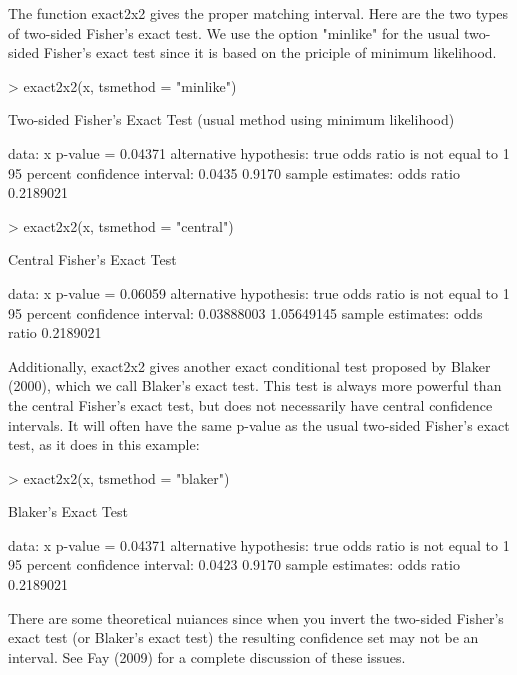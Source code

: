 \documentclass[12pt]{article}
\begin{document}
The function exact2x2 gives the proper matching interval. Here are the two types of two-sided Fisher's exact test. We use the option 
"minlike" for the usual two-sided Fisher's exact test since it is based on the priciple of minimum likelihood.   
\begin{Schunk}
\begin{Sinput}
> exact2x2(x, tsmethod = "minlike")
\end{Sinput}
\begin{Soutput}
	Two-sided Fisher's Exact Test (usual method using minimum likelihood)

data:  x 
p-value = 0.04371
alternative hypothesis: true odds ratio is not equal to 1 
95 percent confidence interval:
 0.0435 0.9170 
sample estimates:
odds ratio 
 0.2189021 
\end{Soutput}
\begin{Sinput}
> exact2x2(x, tsmethod = "central")
\end{Sinput}
\begin{Soutput}
	Central Fisher's Exact Test

data:  x 
p-value = 0.06059
alternative hypothesis: true odds ratio is not equal to 1 
95 percent confidence interval:
 0.03888003 1.05649145 
sample estimates:
odds ratio 
 0.2189021 
\end{Soutput}
\end{Schunk}

Additionally, exact2x2 gives another exact conditional test proposed by Blaker (2000), which we call Blaker's exact test. This test is always more powerful than 
the central Fisher's exact test, but does not necessarily have central confidence intervals. It will often have the same p-value as the usual two-sided 
Fisher's exact test, as it does in this example:
\begin{Schunk}
\begin{Sinput}
> exact2x2(x, tsmethod = "blaker")
\end{Sinput}
\begin{Soutput}
	Blaker's Exact Test

data:  x 
p-value = 0.04371
alternative hypothesis: true odds ratio is not equal to 1 
95 percent confidence interval:
 0.0423 0.9170 
sample estimates:
odds ratio 
 0.2189021 
\end{Soutput}
\end{Schunk}

There are some theoretical nuiances  since when you invert the two-sided Fisher's exact test (or Blaker's exact test)
the resulting confidence set may not be an interval. 
See Fay (2009) for a complete discussion of these issues.   
\end{document}
